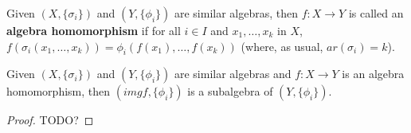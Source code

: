 \begin{definition}
\label{def-algebra-homomorphism}

Given $(X, \{\sigma_i\})$ and $(Y, \{\phi_i\})$ are similar algebras, then $f: X \rightarrow Y$ is called an \textbf{algebra homomorphism} if for all $i \in I$ and $x_1, \ldots, x_k$ in $X$, $f(\sigma_i(x_1, \ldots, x_k)) = \phi_i(f(x_1), \ldots, f(x_k))$ (where, as usual, $ar(\sigma_i) = k$).

\end{definition}


\begin{proposition}
\label{proposition-image-of-homomorphism-is-subalgebra}

Given $(X, \{\sigma_i\})$ and $(Y, \{\phi_i\})$ are similar algebras and $f: X \rightarrow Y$ is an algebra homomorphism, then $(img f, \{\phi_i\})$ is a subalgebra of $(Y, \{\phi_i\})$.

\end{proposition}

\begin{proof}
TODO?

\end{proof}


